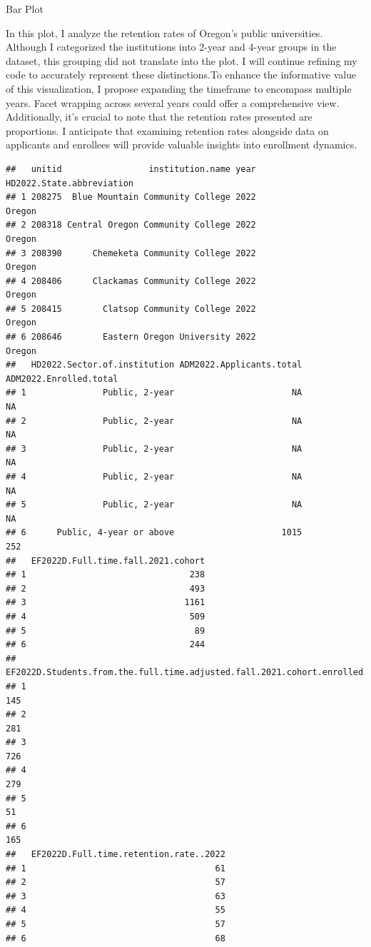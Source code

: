 \documentclass[
]{article}
\begin{document}
Bar Plot

In this plot, I analyze the retention rates of Oregon's public
universities. Although I categorized the institutions into 2-year and
4-year groups in the dataset, this grouping did not translate into the
plot. I will continue refining my code to accurately represent these
distinctions.To enhance the informative value of this visualization, I
propose expanding the timeframe to encompass multiple years. Facet
wrapping across several years could offer a comprehensive view.
Additionally, it's crucial to note that the retention rates presented
are proportions. I anticipate that examining retention rates alongside
data on applicants and enrollees will provide valuable insights into
enrollment dynamics.

\begin{verbatim}
##   unitid                 institution.name year HD2022.State.abbreviation
## 1 208275  Blue Mountain Community College 2022                    Oregon
## 2 208318 Central Oregon Community College 2022                    Oregon
## 3 208390      Chemeketa Community College 2022                    Oregon
## 4 208406      Clackamas Community College 2022                    Oregon
## 5 208415        Clatsop Community College 2022                    Oregon
## 6 208646        Eastern Oregon University 2022                    Oregon
##   HD2022.Sector.of.institution ADM2022.Applicants.total ADM2022.Enrolled.total
## 1               Public, 2-year                       NA                     NA
## 2               Public, 2-year                       NA                     NA
## 3               Public, 2-year                       NA                     NA
## 4               Public, 2-year                       NA                     NA
## 5               Public, 2-year                       NA                     NA
## 6      Public, 4-year or above                     1015                    252
##   EF2022D.Full.time.fall.2021.cohort
## 1                                238
## 2                                493
## 3                               1161
## 4                                509
## 5                                 89
## 6                                244
##   EF2022D.Students.from.the.full.time.adjusted.fall.2021.cohort.enrolled.in.fall.2022
## 1                                                                                 145
## 2                                                                                 281
## 3                                                                                 726
## 4                                                                                 279
## 5                                                                                  51
## 6                                                                                 165
##   EF2022D.Full.time.retention.rate..2022
## 1                                     61
## 2                                     57
## 3                                     63
## 4                                     55
## 5                                     57
## 6                                     68
\end{verbatim}
\end{document}
